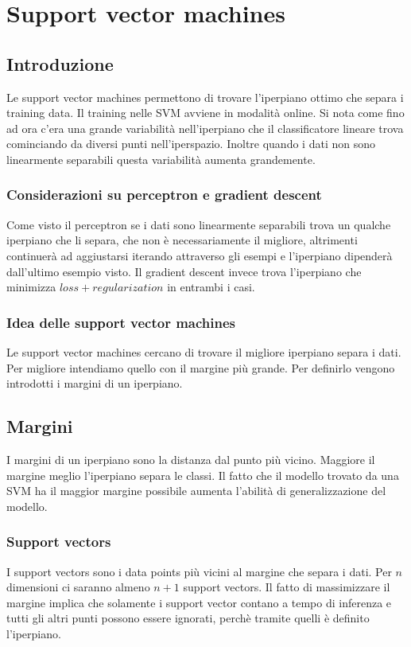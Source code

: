 \chapter{Support vector machines}

\section{Introduzione}
Le support vector machines permettono di trovare l'iperpiano ottimo che separa i training data. 
Il training nelle SVM avviene in modalità online.
Si nota come fino ad ora c'era una grande variabilit\`a nell'iperpiano che il classificatore lineare trova cominciando da diversi punti nell'iperspazio.
Inoltre quando i dati non sono linearmente separabili questa variabilit\`a aumenta grandemente.

	\subsection{Considerazioni su perceptron e gradient descent}
	Come visto il perceptron se i dati sono linearmente separabili trova un qualche iperpiano che li separa, che non \`e necessariamente il migliore, altrimenti continuer\`a ad aggiustarsi iterando attraverso gli esempi e l'iperpiano dipender\`a dall'ultimo esempio visto.
	Il gradient descent invece trova l'iperpiano che minimizza $loss+regularization$ in entrambi i casi.
	
	\subsection{Idea delle support vector machines}
	Le support vector machines cercano di trovare il migliore iperpiano separa i dati. 
	Per migliore intendiamo quello con il margine pi\`u grande.
	Per definirlo vengono introdotti i margini di un iperpiano.

\section{Margini}
I margini di un iperpiano sono la distanza dal punto pi\`u vicino.
Maggiore il margine meglio l'iperpiano separa le classi.
Il fatto che il modello trovato da una SVM ha il maggior margine possibile aumenta l'abilit\`a di generalizzazione del modello.

	\subsection{Support vectors}
	I support vectors sono i data points pi\`u vicini al margine che separa i dati.
	Per $n$ dimensioni ci saranno almeno $n+1$ support vectors.
	Il fatto di massimizzare il margine implica che solamente i support vector contano a tempo di inferenza e tutti gli altri punti possono essere ignorati, perch\`e tramite quelli \`e definito l'iperpiano.
	
